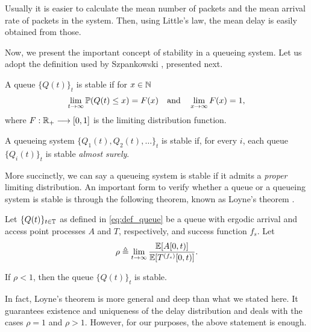 Usually it is easier to calculate the mean number of packets and the mean arrival rate of packets in the system. Then, using Little's law, the mean delay is easily obtained from those.

Now, we present the important concept of stability in a queueing system. Let us adopt the definition used by Szpankowski \cite{szpankowski1994stability}, presented next.

\begin{definition} \label{def:stability}
	A queue $\{Q(t)\}_t$ is stable if for $x\in\N$
    \begin{equation*}
    	\lim_{t\to\infty} \P(Q(t) \le x)
    	    = F(x) \quad\text{and}\quad \lim_{x\to\infty} F(x) = 1,
    \end{equation*}
    where $F:\R_+\longrightarrow[0,1]$ is the limiting distribution function.
    
    A queueing system $\{Q_1(t), Q_2(t), \dots\}_t$ is stable if, for every $i$, each queue $\{Q_i(t)\}_t$ is stable \textit{almost surely}.
\end{definition}

More succinctly, we can say a queueing system is stable if it admits a \textit{proper} limiting distribution.
%
An important form to verify whether a queue or a queueing system is stable is through the following theorem, known as Loyne's theorem \cite{loynes1962stability}.

\begin{theorem} \label{th:loynes}
    Let $\{Q(t)\}_{t\in\T}$ as defined in \eqref{eq:def_queue} be a queue with ergodic arrival and access point processes $A$ and $T$, respectively, and success function $f_s$.
    Let \vspace{-5mm}
    \begin{align*}
        \rho\triangleq \displaystyle\lim_{t\to\infty}\frac{\E[A[0,t)]}{\E[T^{(f_s)}[0,t)]}.
    \end{align*}
    
    If $\rho < 1$, then the queue $\{Q(t)\}_t$ is stable.
\end{theorem}

In fact, Loyne's theorem is more general and deep than what we stated here.
%
It guarantees existence and uniqueness of the delay distribution and deals with the cases $\rho=1$ and $\rho>1$.
%
However, for our purposes, the above statement is enough.

